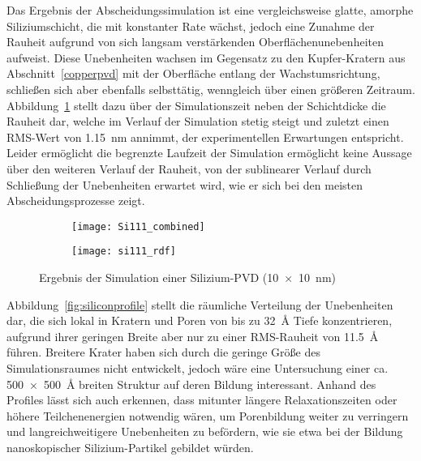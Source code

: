 Das Ergebnis der Abscheidungssimulation ist eine vergleichsweise glatte, amorphe Siliziumschicht, die mit konstanter Rate wächst, jedoch eine Zunahme der Rauheit aufgrund von sich langsam verstärkenden Oberflächenunebenheiten aufweist.
Diese Unebenheiten wachsen im Gegensatz zu den Kupfer-Kratern aus Abschnitt~\ref{copperpvd} mit der Oberfläche entlang der Wachstumsrichtung, schließen sich aber ebenfalls selbsttätig, wenngleich über einen größeren Zeitraum.
Abbildung~\ref{fig:siliconresults-a} stellt dazu über der Simulationszeit neben der Schichtdicke die Rauheit dar, welche im Verlauf der Simulation stetig steigt und zuletzt einen RMS-Wert von \SI{1.15}{\nano\meter} annimmt, der experimentellen Erwartungen entspricht.
Leider ermöglicht die begrenzte Laufzeit der Simulation ermöglicht keine Aussage über den weiteren Verlauf der Rauheit, von der sublinearer Verlauf durch Schließung der Unebenheiten erwartet wird, wie er sich bei den meisten Abscheidungsprozesse zeigt.

\begin{figure}
  \captionsetup[subfigure]{singlelinecheck=false}
  \def\subfigwidth{0.48\textwidth}
  \begin{subfigure}[t]{\subfigwidth}
    \texttt{[image: Si111\_combined]}
    \label{fig:siliconresults-a}
  \end{subfigure}
  \begin{subfigure}[t]{\subfigwidth}
    \texttt{[image: si111\_rdf]}
    \label{fig:siliconresults-b}
  \end{subfigure}
  \hfill
  \caption[Ergebnisse der Simulation einer Silizium-PVD]{Ergebnis der Simulation einer Silizium-PVD (\SI{10x10}{\nano\meter})}
  \label{fig:siliconresults}
\end{figure}

Abbildung~\ref{fig:siliconprofile} stellt die räumliche Verteilung der Unebenheiten dar, die sich lokal in Kratern und Poren von bis zu \SI{32}{\angstrom} Tiefe konzentrieren, aufgrund ihrer geringen Breite aber nur zu einer RMS-Rauheit von \SI{11.5}{\angstrom} führen.
Breitere Krater haben sich durch die geringe Größe des Simulationsraumes nicht entwickelt, jedoch wäre eine Untersuchung einer ca. \SI{500x500}{\angstrom} breiten Struktur auf deren Bildung interessant.
Anhand des Profiles lässt sich auch erkennen, dass mitunter längere Relaxationszeiten oder höhere Teilchenenergien notwendig wären, um Porenbildung weiter zu verringern und langreichweitigere Unebenheiten zu befördern, wie sie etwa bei der Bildung nanoskopischer Silizium-Partikel gebildet würden.

